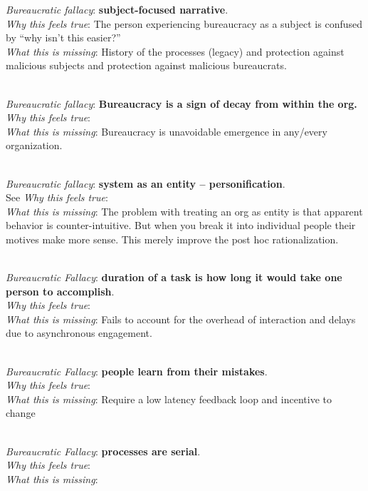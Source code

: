 \textit{Bureaucratic fallacy}: \textbf{subject-focused narrative}. \\
\textit{Why this feels true}: The person experiencing bureaucracy as a subject is confused by ``why isn't this easier?''  \\
\textit{What this is missing}: History of the processes (legacy) and protection against malicious subjects and protection against malicious bureaucrats. 

\ \\

\textit{Bureaucratic fallacy}: \textbf{Bureaucracy is a sign of decay from within the org.} \\
\textit{Why this feels true}: \\
\textit{What this is missing}: Bureaucracy is unavoidable emergence in any/every organization.

\ \\

\textit{Bureaucratic fallacy}: \textbf{system as an entity -- personification}. \\
See \cite{2002_Gall}
\textit{Why this feels true}: \\
\textit{What this is missing}: The problem with treating an org as entity is that apparent behavior is counter-intuitive. But when you break it into individual people their motives make more sense. This merely improve the post hoc rationalization. 

\ \\

\textit{Bureaucratic Fallacy}: \textbf{duration of a task is how long it would take one person to accomplish}.  \\
\textit{Why this feels true}: \\
\textit{What this is missing}: Fails to account for the overhead of interaction and delays due to asynchronous engagement.

\ \\

\textit{Bureaucratic Fallacy}: \textbf{people learn from their mistakes}. \\
\textit{Why this feels true}: \\
\textit{What this is missing}: Require a low latency feedback loop and incentive to change

\ \\

\textit{Bureaucratic Fallacy}: \textbf{processes are serial}.\\
\textit{Why this feels true}: \\
\textit{What this is missing}: 


